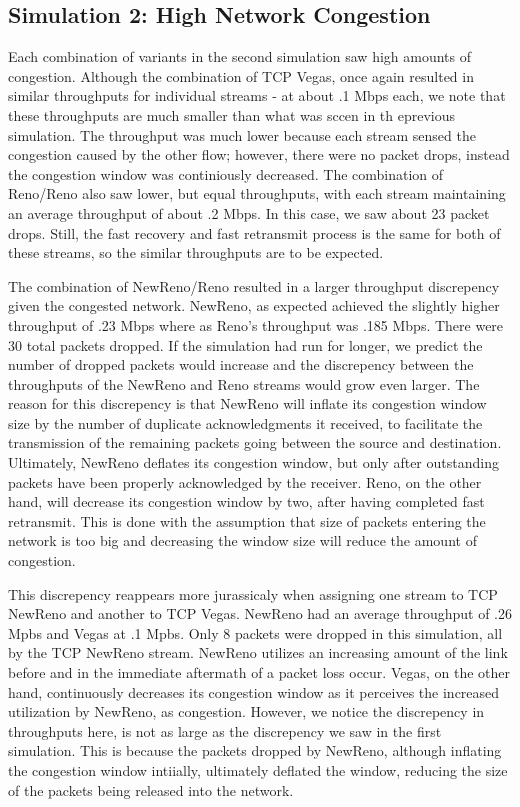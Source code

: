 \subsection{Simulation 2: High Network Congestion}

Each combination of variants in the second simulation saw high amounts of congestion. Although the combination of TCP Vegas, once again resulted in similar throughputs for individual streams - at about .1 Mbps each, we note that these throughputs are much smaller than what was sccen in th eprevious simulation. The throughput was much lower because each stream sensed the congestion caused by the other flow; however, there were no packet drops, instead the congestion window was continiously decreased. The combination of Reno/Reno also saw lower, but equal throughputs, with each stream maintaining an average throughput of about .2 Mbps. In this case, we saw about 23 packet drops. Still, the fast recovery and fast retransmit process is the same for both of these streams, so the similar throughputs are to be expected.

The combination of NewReno/Reno resulted in a larger throughput discrepency given the congested network. NewReno, as expected achieved the slightly higher throughput of .23 Mbps where as Reno's throughput was .185 Mbps. There were 30 total packets dropped. If the simulation had run for longer, we predict the number of dropped packets would increase and the discrepency between the throughputs of the NewReno and Reno streams would grow even larger.
The reason for this discrepency is that NewReno will inflate its congestion window size by the number of duplicate acknowledgments it received, to facilitate the transmission of the remaining packets going between the source and destination. Ultimately, NewReno deflates its congestion window, but only after outstanding packets have been properly acknowledged by the receiver. Reno, on the other hand, will decrease its congestion window by two, after having completed fast retransmit. This is done with the assumption that size of packets entering the network is too big and decreasing the window size will reduce the amount of congestion.

This discrepency reappears more jurassicaly when assigning one stream to TCP NewReno and another to TCP Vegas. NewReno had an average throughput of .26 Mpbs and Vegas at .1 Mpbs. Only 8 packets were dropped in this simulation, all by the TCP NewReno stream. NewReno utilizes an increasing amount of the link before and in the immediate aftermath of a packet loss occur. Vegas, on the other hand, continuously decreases its congestion window as it perceives the increased utilization by NewReno, as congestion. However, we notice the discrepency in throughputs here, is not as large as the discrepency we saw in the first simulation. This is because the packets dropped by NewReno, although inflating the congestion window intiially, ultimately deflated the window, reducing the size of the packets being released into the network.




